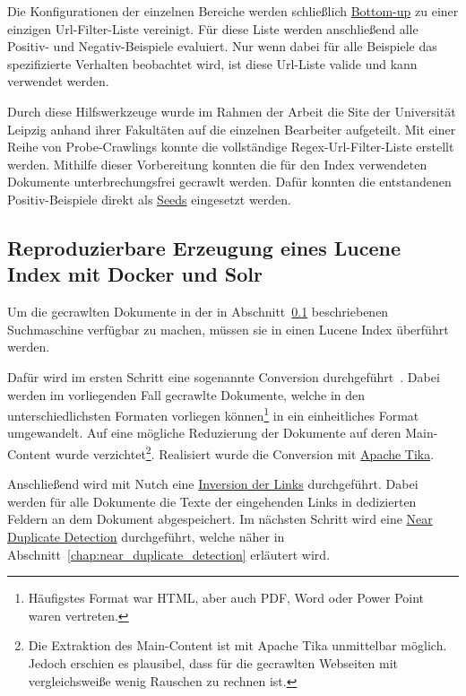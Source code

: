 Die Konfigurationen der einzelnen Bereiche werden schließlich \href{https://de.wikipedia.org/wiki/Top-down_und_Bottom-up}{Bottom-up} zu einer einzigen 
Url-Filter-Liste vereinigt.
Für diese Liste werden anschließend alle Positiv- und Negativ-Beispiele evaluiert.
Nur wenn dabei für alle Beispiele das spezifizierte Verhalten beobachtet wird, ist diese Url-Liste valide und kann verwendet werden.

Durch diese Hilfswerkzeuge wurde im Rahmen der Arbeit die Site der Universität Leipzig anhand ihrer Fakultäten auf die einzelnen Bearbeiter aufgeteilt.
Mit einer Reihe von Probe-Crawlings konnte die vollständige Regex-Url-Filter-Liste erstellt werden.
Mithilfe dieser Vorbereitung konnten die für den Index verwendeten Dokumente unterbrechungsfrei gecrawlt werden.
Dafür konnten die entstandenen Positiv-Beispiele direkt als \href{https://wiki.apache.org/nutch/NutchTutorial#Create_a_URL_seed_list-1}{Seeds} eingesetzt werden.

\subsection{Reproduzierbare Erzeugung eines Lucene Index mit Docker und Solr}

Um die gecrawlten Dokumente in der in Abschnitt~\ref{} beschriebenen Suchmaschine verfügbar zu machen, müssen sie in einen Lucene Index überführt werden.

Dafür wird im ersten Schritt eine sogenannte Conversion durchgeführt~\cite{croft.chap2}.
Dabei werden im vorliegenden Fall gecrawlte Dokumente,
welche in den unterschiedlichsten Formaten vorliegen können\footnote{Häufigstes Format war HTML, aber auch PDF, Word oder Power Point waren vertreten.}
in ein einheitliches Format umgewandelt.
Auf eine mögliche Reduzierung der Dokumente auf deren Main-Content wurde
verzichtet\footnote{Die Extraktion des Main-Content ist mit Apache Tika
unmittelbar möglich. Jedoch erschien es plausibel, dass für die gecrawlten Webseiten mit vergleichsweiße wenig Rauschen zu rechnen ist.}.
Realisiert wurde die Conversion mit \href{https://en.wikipedia.org/wiki/Apache_Tika}{Apache Tika}.

Anschließend wird mit Nutch eine \href{https://wiki.apache.org/nutch/bin/nutch_invertlinks}{Inversion der Links} durchgeführt.
Dabei werden für alle Dokumente die Texte der eingehenden Links in dedizierten Feldern an dem Dokument abgespeichert.
Im nächsten Schritt wird eine \href{https://github.com/apache/nutch/blob/master/src/java/org/apache/nutch/crawl/TextProfileSignature.java}{Near Duplicate Detection}
durchgeführt, welche näher in Abschnitt~\ref{chap:near_duplicate_detection} erläutert wird.

